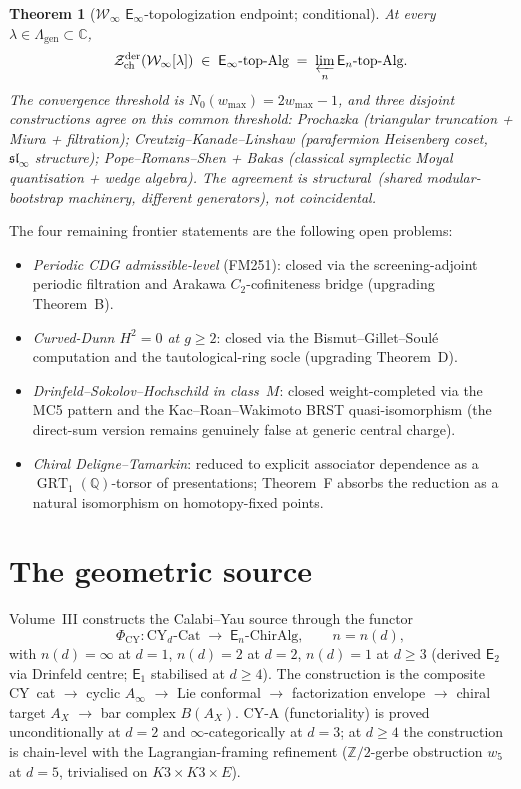 \documentclass[11pt]{article}
\providecommand{\cW}{\mathcal{W}}
\providecommand{\cZ}{\mathcal{Z}}
\providecommand{\bC}{\mathbb{C}}
\providecommand{\bQ}{\mathbb{Q}}
\providecommand{\bZ}{\mathbb{Z}}
\providecommand{\Eone}{\mathsf{E}_{1}}
\providecommand{\Etwo}{\mathsf{E}_{2}}
\providecommand{\Einf}{\mathsf{E}_{\infty}}
\providecommand{\En}{\mathsf{E}_{n}}
\providecommand{\Phicy}{\Phi_{\mathrm{CY}}}
\providecommand{\GRTone}{\operatorname{GRT}_{1}}
\newtheorem{theorem}{Theorem}[section]
\begin{document}
\begin{theorem}[$\cW_\infty$ $\Einf$-topologization endpoint; conditional]
At every $\lambda\in\Lambda_{\mathrm{gen}}\subset\bC$,
\[
\cZ^{\mathrm{der}}_{\mathrm{ch}}(\cW_\infty[\lambda])
\;\in\; \Einf\text{-top-Alg}
\;=\; \varprojlim_n \En\text{-top-Alg}.
\]
The convergence threshold is $N_0(w_{\max}) = 2w_{\max}-1$, and
three disjoint constructions agree on this common threshold:
Prochazka \textup{(}triangular truncation + Miura + filtration\textup{)};
Creutzig--Kanade--Linshaw \textup{(}parafermion Heisenberg coset,
$\mathfrak{sl}_\infty$ structure\textup{)};
Pope--Romans--Shen + Bakas \textup{(}classical symplectic Moyal
quantisation + wedge algebra\textup{)}. The agreement is
structural~\textup{(}shared modular-bootstrap machinery, different
generators\textup{)}, not coincidental.
\end{theorem}

The four remaining frontier statements are the following open problems:

\begin{itemize}[nosep]
\item \emph{Periodic CDG admissible-level} \textup{(FM251)}: closed
via the screening-adjoint periodic filtration and Arakawa
$C_2$-cofiniteness bridge (upgrading Theorem~B).
\item \emph{Curved-Dunn $H^2=0$ at $g\ge 2$}: closed via the
Bismut--Gillet--Soul\'e computation and the tautological-ring
socle (upgrading Theorem~D).
\item \emph{Drinfeld--Sokolov--Hochschild in class~$M$}: closed
weight-completed via the MC5 pattern and the Kac--Roan--Wakimoto
BRST quasi-isomorphism (the direct-sum version remains genuinely
false at generic central charge).
\item \emph{Chiral Deligne--Tamarkin}: reduced to explicit
associator dependence as a $\GRTone(\bQ)$-torsor of presentations;
Theorem~F absorbs the reduction as a natural isomorphism on
homotopy-fixed points.
\end{itemize}

\section{The geometric source}

\noindent
Volume~III constructs the Calabi--Yau source through the functor
\[
\Phicy\colon \mathrm{CY}_d\text{-}\mathrm{Cat}
\;\longrightarrow\; \En\text{-ChirAlg},
\qquad n = n(d),
\]
with $n(d) = \infty$ at $d=1$, $n(d) = 2$ at $d=2$, $n(d) = 1$ at
$d\ge 3$ \textup{(}derived $\Etwo$ via Drinfeld centre; $\Eone$
stabilised at $d\ge 4$\textup{)}. The construction is the composite
CY~cat $\to$ cyclic $A_\infty$ $\to$ Lie conformal $\to$
factorization envelope $\to$ chiral target $A_X$ $\to$ bar complex
$B(A_X)$. CY-A \textup{(}functoriality\textup{)} is proved
unconditionally at $d=2$ and $\infty$-categorically at $d=3$; at
$d\ge 4$ the construction is chain-level with the Lagrangian-framing
refinement \textup{(}$\bZ/2$-gerbe obstruction $w_5$ at $d=5$,
trivialised on $K3\times K3\times E$\textup{)}.
\end{document}

